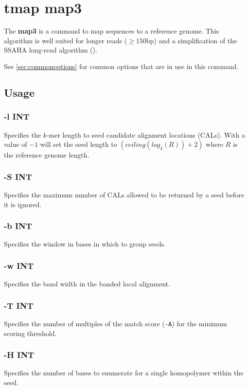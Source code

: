 \documentclass[a4paper,12pt]{book}
\newcommand{\TT}[1]{{\tt #1}} %
\newcommand{\BF}[1]{{\bf #1}} %
\begin{document}
\section{tmap map3}
\label{sec:map3}
The \BF{map3} is a command to map sequences to a reference genome.
This algorithm is well suited for longer reads ($\geq 150$bp) and a simplification of the SSAHA long-read algorithm (\cite{SSAHA}).

See \autoref{sec:commonoptions} for common options that are in use in this command.

\subsection{Usage}

\subsubsection{-l INT}
Specifies the $k$-mer length to seed candidate alignment locations (CALs).
With a value of $-1$ will set the seed length to $\left(ceiling(log_4(R)) + 2\right)$ where $R$ is the reference genome length.

\subsubsection{-S INT}
Specifies the maximum number of CALs allowed to be returned by a seed before it is ignored.

\subsubsection{-b INT}
Specifies the window in bases in which to group seeds.

\subsubsection{-w INT}
Specifies the band width in the banded local alignment.

\subsubsection{-T INT}
Specifies the number of multiples of the match score (\TT{-A}) for the minimum scoring threshold.

\subsubsection{-H INT}
Specifies the number of bases to enumerate for a single homopolymer within the seed.
\end{document}
